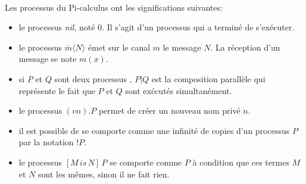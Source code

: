 \documentclass[10pt,a4paper]{article}
\begin{document}
\paragraph{}
Les processus du Pi-calculus ont les significations suivantes:\newline

\begin{itemize}
\item le processus \textit{nil}, noté 0. Il s'agit d'un processus qui a terminé de s'exécuter.
\item le processus $\bar{m}\langle N\rangle$ émet sur le canal $m$ le message $N$. La réception d'un message se note $m(x)$.
\item si $P$ et $Q$ sont deux processus , $P|Q$ est la composition parallèle qui représente le fait que $P$ et $Q$ sont exécutés simultanément.
\item le processus $(vn).P$ permet de créer un nouveau nom privé $n$.
\item il est possible de se comporte comme une infinité de copies d'un processus $P$ par la notation $!P$.
\item le processus $[M\,is\,N]\,P$ se comporte comme $P$ à condition que ces termes $M$ et $N$   sont les m\^{e}mes, sinon il ne fait rien.
\end{itemize}
\end{document}
